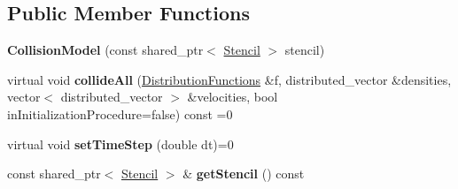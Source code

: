 \subsection*{Public Member Functions}
\begin{DoxyCompactItemize}
\item 
\hypertarget{classnatrium_1_1CollisionModel_a5e5254caec7f69000646886be11a34f8}{
{\bfseries CollisionModel} (const shared\_\-ptr$<$ \hyperlink{classnatrium_1_1Stencil}{Stencil} $>$ stencil)}
\label{classnatrium_1_1CollisionModel_a5e5254caec7f69000646886be11a34f8}

\item 
\hypertarget{classnatrium_1_1CollisionModel_ac7443a320a4badab46185915b78d002f}{
virtual void {\bfseries collideAll} (\hyperlink{classnatrium_1_1DistributionFunctions}{DistributionFunctions} \&f, distributed\_\-vector \&densities, vector$<$ distributed\_\-vector $>$ \&velocities, bool inInitializationProcedure=false) const =0}
\label{classnatrium_1_1CollisionModel_ac7443a320a4badab46185915b78d002f}

\item 
\hypertarget{classnatrium_1_1CollisionModel_aa0df0674bc26821d037323ac184fb52b}{
virtual void {\bfseries setTimeStep} (double dt)=0}
\label{classnatrium_1_1CollisionModel_aa0df0674bc26821d037323ac184fb52b}

\item 
\hypertarget{classnatrium_1_1CollisionModel_a482808bab1832ee06892630b8ead7dde}{
const shared\_\-ptr$<$ \hyperlink{classnatrium_1_1Stencil}{Stencil} $>$ \& {\bfseries getStencil} () const }
\label{classnatrium_1_1CollisionModel_a482808bab1832ee06892630b8ead7dde}


\end{DoxyCompactItemize}
